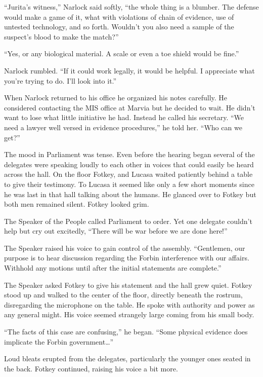 ``Jurita's witness,'' Narlock said softly, ``the whole thing is a blumber. The defense would
make a game of it, what with violations of chain of evidence, use of untested technology, and so
forth. Wouldn't you also need a sample of the suspect's blood to make the match?''

``Yes, or any biological material. A scale or even a toe shield would be fine.''

Narlock rumbled. ``If it could work legally, it would be helpful. I appreciate what you're
trying to do. I'll look into it.''

When Narlock returned to his office he organized his notes carefully. He considered contacting
the MIS office at Marvia but he decided to wait. He didn't want to lose what little initiative
he had. Instead he called his secretary. ``We need a lawyer well versed in evidence
procedures,'' he told her. ``Who can we get?''

\spacebreak

The mood in Parliament was tense. Even before the hearing began several of the delegates were
speaking loudly to each other in voices that could easily be heard across the hall. On the floor
Fotkey, and Lucasa waited patiently behind a table to give their testimony. To Lucasa it seemed
like only a few short moments since he was last in that hall talking about the humans. He
glanced over to Fotkey but both men remained silent. Fotkey looked grim.

The Speaker of the People called Parliament to order. Yet one delegate couldn't help but cry out
excitedly, ``There will be war before we are done here!''

The Speaker raised his voice to gain control of the assembly. ``Gentlemen, our purpose is to
hear discussion regarding the Forbin interference with our affairs. Withhold any motions until
after the initial statements are complete.''

The Speaker asked Fotkey to give his statement and the hall grew quiet. Fotkey stood up and
walked to the center of the floor, directly beneath the rostrum, disregarding the microphone on
the table. He spoke with authority and power as any general might. His voice seemed strangely
large coming from his small body.

``The facts of this case are confusing,'' he began. ``Some physical evidence does implicate the
Forbin government\ldots''

Loud bleats erupted from the delegates, particularly the younger ones seated in the back.
Fotkey continued, raising his voice a bit more.

